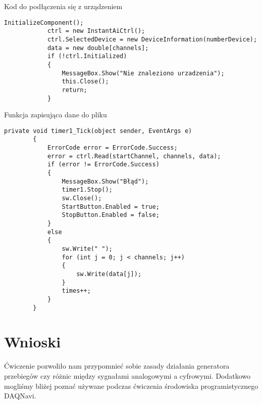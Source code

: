 \documentclass{article}
\begin{document}
\begin{listing}[H]
\caption{Kod do podłączenia się z urządzeniem}
\begin{verbatim}
InitializeComponent();
            ctrl = new InstantAiCtrl();
            ctrl.SelectedDevice = new DeviceInformation(numberDevice);
            data = new double[channels];
            if (!ctrl.Initialized)
            {
                MessageBox.Show("Nie znaleziono urzadzenia");
                this.Close();
                return;
            }
\end{verbatim}
\label{lst:connect}
\end{listing}


\begin{listing}[H]
\caption{Funkcja zapisująca dane do pliku}
\begin{verbatim}
private void timer1_Tick(object sender, EventArgs e)
        {
            ErrorCode error = ErrorCode.Success;
            error = ctrl.Read(startChannel, channels, data);
            if (error != ErrorCode.Success)
            {
                MessageBox.Show("Błąd");
                timer1.Stop();
                sw.Close();
                StartButton.Enabled = true;
                StopButton.Enabled = false;
            }
            else
            {
                sw.Write(" ");
                for (int j = 0; j < channels; j++)
                {
                    sw.Write(data[j]);
                }
                times++;
            }
        }
\end{verbatim}
\label{lst:write_bytes}
\end{listing}


\section{Wnioski}

Ćwiczenie pozwoliło nam przypomnieć sobie zasady działania generatora przebiegów czy różnic między sygnałami analogowymi a cyfrowymi. Dodatkowo mogliśmy bliżej poznać używane podczas ćwiczenia środowiska programistycznego DAQNavi.
\newpage

\listoflistings
\end{document}
